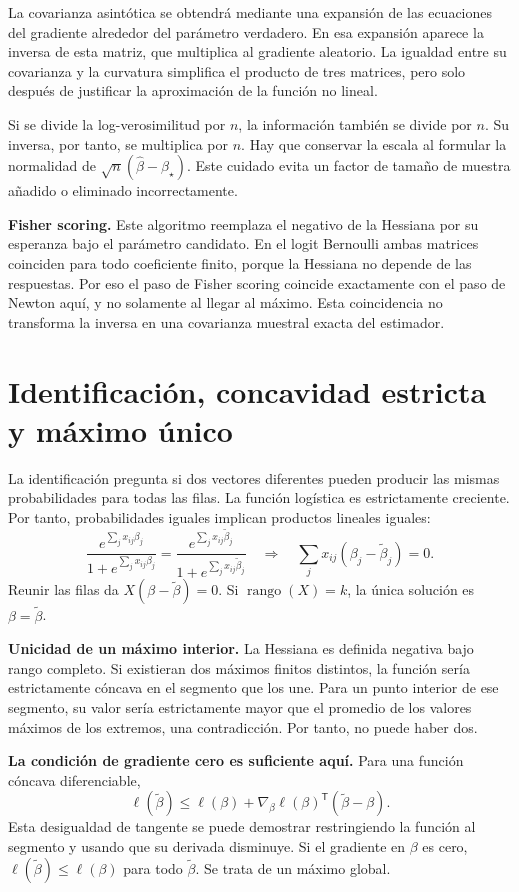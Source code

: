 \documentclass[11pt,a4paper]{article}
\newcommand{\T}{^{\mathsf T}}
\DeclareMathOperator{\rank}{rango}
\begin{document}
La covarianza asintótica se obtendrá mediante una expansión de
las ecuaciones del gradiente alrededor del parámetro verdadero.
En esa expansión aparece la inversa de esta matriz, que multiplica
al gradiente aleatorio.
La igualdad entre su covarianza y la curvatura simplifica el
producto de tres matrices, pero solo después de justificar la
aproximación de la función no lineal.

Si se divide la log-verosimilitud por $n$, la información también
se divide por $n$. Su inversa, por tanto, se multiplica por $n$.
Hay que conservar la escala al formular la normalidad de
$\sqrt n(\widehat\beta-\beta_\star)$.
Este cuidado evita un factor de tamaño de muestra añadido o
eliminado incorrectamente.

\textbf{Fisher scoring.} Este algoritmo reemplaza el negativo
de la Hessiana por su esperanza bajo el parámetro candidato.
En el logit Bernoulli ambas matrices coinciden para todo
coeficiente finito, porque la Hessiana no depende de las respuestas.
Por eso el paso de Fisher scoring coincide exactamente con
el paso de Newton aquí, y no solamente al llegar al máximo.
Esta coincidencia no transforma la inversa en una covarianza
muestral exacta del estimador.

\clearpage
\section{Identificación, concavidad estricta y máximo único}\label{logit35}
La identificación pregunta si dos vectores diferentes pueden producir
las mismas probabilidades para todas las filas.
La función logística es estrictamente creciente.
Por tanto, probabilidades iguales implican productos lineales iguales:
\[
\frac{e^{\sum_jx_{ij}\beta_j}}{1+e^{\sum_jx_{ij}\beta_j}}
=\frac{e^{\sum_jx_{ij}\widetilde\beta_j}}{1+e^{\sum_jx_{ij}\widetilde\beta_j}}
\quad\Longrightarrow\quad
\sum_jx_{ij}(\beta_j-\widetilde\beta_j)=0.
\]
Reunir las filas da $X(\beta-\widetilde\beta)=0$.
Si $\rank(X)=k$, la única solución es $\beta=\widetilde\beta$.

\textbf{Unicidad de un máximo interior.}
La Hessiana es definida negativa bajo rango completo.
Si existieran dos máximos finitos distintos, la función sería
estrictamente cóncava en el segmento que los une.
Para un punto interior de ese segmento, su valor sería estrictamente
mayor que el promedio de los valores máximos de los extremos,
una contradicción. Por tanto, no puede haber dos.

\textbf{La condición de gradiente cero es suficiente aquí.}
Para una función cóncava diferenciable,
\[
\ell(\widetilde\beta)
\le\ell(\beta)+
\nabla_\beta\ell(\beta)\T(\widetilde\beta-\beta).
\]
Esta desigualdad de tangente se puede demostrar restringiendo la
función al segmento y usando que su derivada disminuye.
Si el gradiente en $\beta$ es cero,
$\ell(\widetilde\beta)\le\ell(\beta)$ para todo $\widetilde\beta$.
Se trata de un máximo global.
\end{document}
